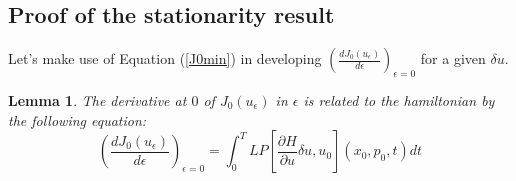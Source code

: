 \documentclass[a4paper,10pt]{article}
\newtheorem{lemm}{Lemma}
\begin{document}
\subsection{Proof of the stationarity result}
Let's make use of Equation (\ref{J0min}) in developing 
$\left(\frac{dJ_{0}(u_{\epsilon})}{d \epsilon}\right)_{\epsilon=0}$
for a given $\delta u$.
\begin{lemm}
    The derivative at $0$ of $J_{0}(u_{\epsilon})$ in $\epsilon$ is 
    related to the hamiltonian by the following equation:
    \begin{equation}
        \left(\frac{dJ_{0}(u_{\epsilon})}{d \epsilon}\right)_{\epsilon=0} 
	  = \int_{0}^{T} LP\left[ \frac{\partial H}{\partial u} \delta 
	   u, u_{0}\right](x_{0},p_{0},t) dt
        \label{J0hamiltonian}
    \end{equation}
\end{lemm}
\end{document}
